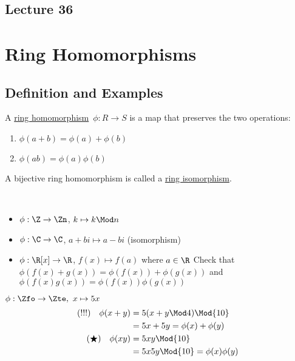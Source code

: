 \subsection*{Lecture 36} %

\section{Ring Homomorphisms}
\subsection{Definition and Examples}
  \begin{definition}
    A \ul{ring homomorphism}\  \( \phi: R\to S \) is a map that preserves the two operations:
    \begin{enumerate}
      \item \( \phi(a+b) = \phi(a) + \phi(b) \)
      \item \( \phi(ab) = \phi(a)\phi(b) \)
    \end{enumerate}
    A bijective ring homomorphism is called a \ul{ring isomorphism}.
  \end{definition}

\begin{examples}\
  \begin{itemize}
    \item \( \phi:\Z\to\Zn \), \( k\mapsto k\Mod n \)
    \item \( \phi:\C\to\C \), \( a+bi\mapsto a-bi \) (isomorphism)
    \item \( \phi:\R[x]\to\R \), \( f(x)\mapsto f(a) \) where \( a\in\R \)
    Check that \( \phi(f(x) + g(x)) = \phi(f(x)) + \phi(g(x)) \) and \( \phi(f(x)g(x)) = \phi(f(x))\phi(g(x)) \)
  \end{itemize}
\end{examples}

\begin{example}
  \( \phi:\Zfo\to\Zte,\ x\mapsto 5x \)
  \begin{align*}
    (!!!)\quad \phi(x+y) &= 5(x+y\Mod 4) \Mod{10} \\
    &= 5x+5y = \phi(x)+\phi(y) \\
    (\bigstar)\quad \phi(xy) &= 5xy \Mod{10} \\
    &= 5x 5y \Mod{10} = \phi(x)\phi(y)
  \end{align*}
\end{example}

